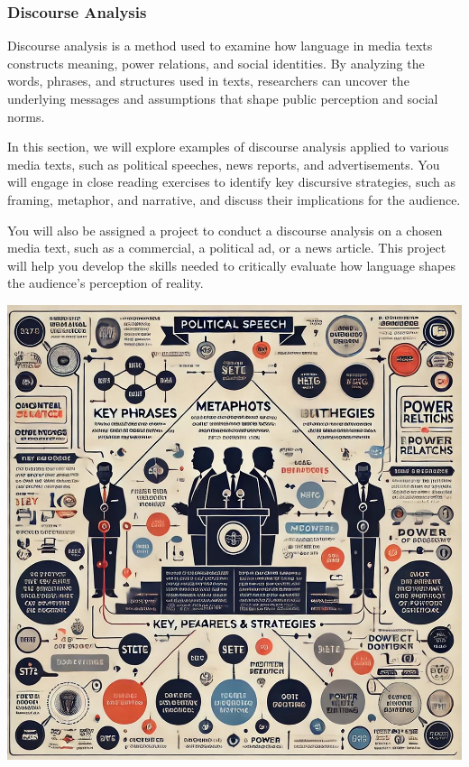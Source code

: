\documentclass[
]{book}
\begin{document}
\subsubsection{Discourse Analysis}\label{discourse-analysis}

Discourse analysis is a method used to examine how language in media texts constructs meaning, power relations, and social identities. By analyzing the words, phrases, and structures used in texts, researchers can uncover the underlying messages and assumptions that shape public perception and social norms.

In this section, we will explore examples of discourse analysis applied to various media texts, such as political speeches, news reports, and advertisements. You will engage in close reading exercises to identify key discursive strategies, such as framing, metaphor, and narrative, and discuss their implications for the audience.

You will also be assigned a project to conduct a discourse analysis on a chosen media text, such as a commercial, a political ad, or a news article. This project will help you develop the skills needed to critically evaluate how language shapes the audience's perception of reality.

\includegraphics[width=1\linewidth,height=\textheight,keepaspectratio]{images/fig100.jpg}
\end{document}
